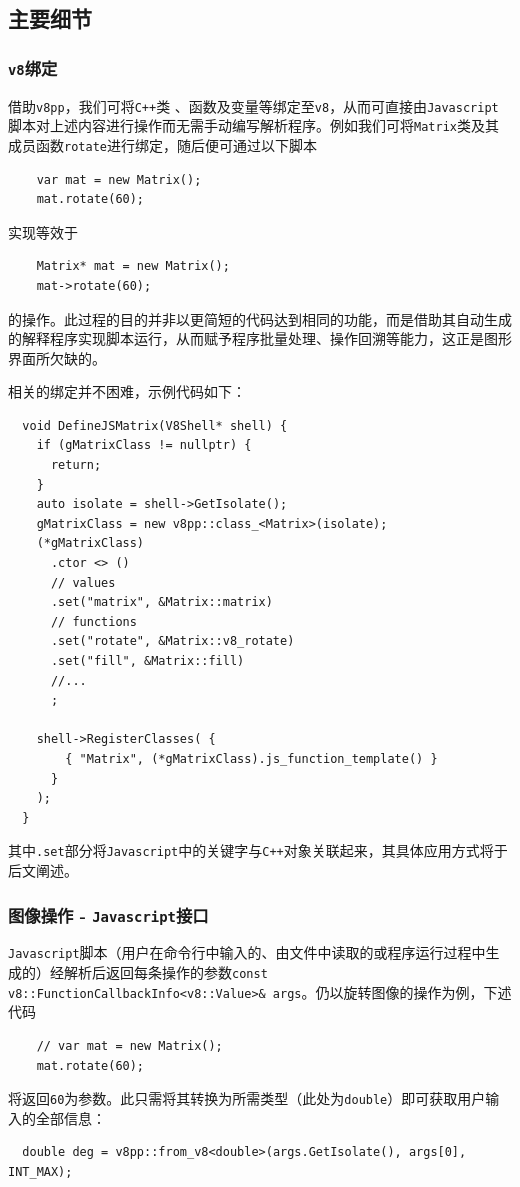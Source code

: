 \documentclass[a4paper,11pt,fontset=fandol]{article}
\begin{document}
\subsection{主要细节}
\subsubsection{\texttt{v8}绑定}
借助\texttt{v8pp}，我们可将\texttt{C++}类 、函数及变量等绑定至\texttt{v8}，从而可直接由\texttt{Javascript}脚本对上述内容进行操作而无需手动编写解析程序。例如我们可将\texttt{Matrix}类及其成员函数\texttt{rotate}进行绑定，随后便可通过以下脚本
\begin{verbatim}
    var mat = new Matrix();
    mat.rotate(60);
\end{verbatim}
实现等效于
\begin{verbatim}
    Matrix* mat = new Matrix();
    mat->rotate(60);
\end{verbatim}
的操作。此过程的目的并非以更简短的代码达到相同的功能，而是借助其自动生成的解释程序实现脚本运行，从而赋予程序批量处理、操作回溯等能力，这正是图形界面所欠缺的。

相关的绑定并不困难，示例代码如下：
\begin{verbatim}
  void DefineJSMatrix(V8Shell* shell) {
    if (gMatrixClass != nullptr) {
      return;
    }
    auto isolate = shell->GetIsolate();
    gMatrixClass = new v8pp::class_<Matrix>(isolate);
    (*gMatrixClass)
      .ctor <> ()
      // values
      .set("matrix", &Matrix::matrix)
      // functions
      .set("rotate", &Matrix::v8_rotate)
      .set("fill", &Matrix::fill)
      //...
      ;
  
    shell->RegisterClasses( {
        { "Matrix", (*gMatrixClass).js_function_template() }
      }
    );
  }
\end{verbatim}

其中\texttt{.set}部分将\texttt{Javascript}中的关键字与\texttt{C++}对象关联起来，其具体应用方式将于后文阐述。

\subsubsection{图像操作 - \texttt{Javascript}接口}
\texttt{Javascript}脚本（用户在命令行中输入的、由文件中读取的或程序运行过程中生成的）经解析后返回每条操作的参数\texttt{const v8::FunctionCallbackInfo<v8::Value>\& args}。仍以旋转图像的操作为例，下述代码

\begin{verbatim}
    // var mat = new Matrix();
    mat.rotate(60);
\end{verbatim}
将返回\texttt{60}为参数。此只需将其转换为所需类型（此处为\texttt{double}）即可获取用户输入的全部信息：
\begin{verbatim}
  double deg = v8pp::from_v8<double>(args.GetIsolate(), args[0], INT_MAX);
\end{verbatim}
\end{document}
